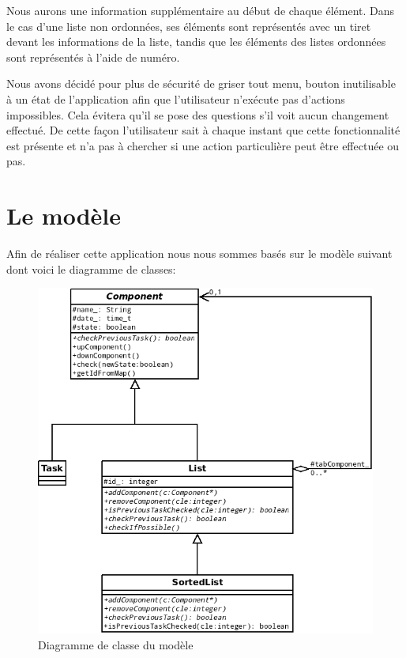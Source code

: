 \documentclass[a4paper,10pt]{article}
\begin{document}
Nous aurons une information supplémentaire au début de chaque élément. Dans le cas d'une liste non ordonnées, ses éléments sont représentés avec un tiret devant les informations de la liste, tandis que les éléments des listes ordonnées sont représentés à l'aide de numéro.

Nous avons décidé pour plus de sécurité de griser tout menu, bouton inutilisable à un état de l'application afin que l'utilisateur n'exécute pas
d'actions impossibles. Cela évitera qu'il se pose des questions s'il voit aucun changement effectué. De cette façon l'utilisateur sait à
chaque instant que cette fonctionnalité est présente et n'a pas à chercher si une action particulière peut être effectuée ou pas.

\newpage
\section{Le modèle}
Afin de réaliser cette application nous nous sommes basés sur le modèle suivant dont voici le diagramme de classes:
\begin{figure}[htpb]
	\center
	\includegraphics[scale=0.5]{Images/dia_classe.png}
	\caption{Diagramme de classe du modèle}
\end{figure}
\end{document}
